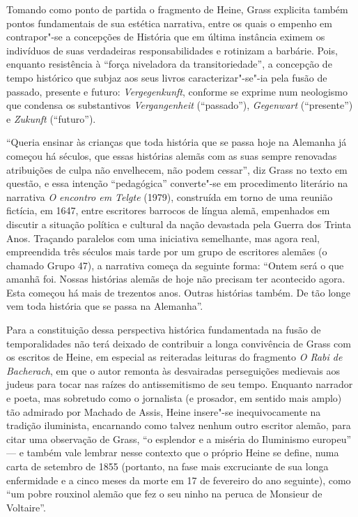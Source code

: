 Tomando como ponto de partida o fragmento de Heine, Grass explicita
também pontos fundamentais de sua estética narrativa, entre os quais o
empenho em contrapor"-se a concepções de História que em última
instância eximem os indivíduos de suas verdadeiras responsabilidades e
rotinizam a barbárie. Pois, enquanto resistência à “força niveladora da
transitoriedade”, a concepção de tempo histórico que subjaz aos seus
livros caracterizar"-se"-ia pela fusão de passado, presente e
futuro: \textit{Vergegenkunft}, conforme se exprime num neologismo que
condensa os substantivos \textit{Vergangenheit} (“passado”),
\textit{Gegenwart} (“presente”) e \textit{Zukunft} (“futuro”).

“Queria ensinar às crianças que toda história que se passa hoje na
Alemanha já começou há séculos, que essas histórias alemãs com as suas
sempre renovadas atribuições de culpa não envelhecem, não podem
cessar”, diz Grass no texto em questão, e essa intenção “pedagógica”
converte"-se em procedimento literário na narrativa \textit{O encontro
em Telgte} (1979), construída em torno de uma reunião fictícia, em
1647, entre escritores barrocos de língua alemã, empenhados em discutir
a situação política e cultural da nação devastada pela Guerra dos
Trinta Anos. Traçando paralelos com uma iniciativa semelhante, mas
agora real, empreendida três séculos mais tarde por um grupo de
escritores alemães (o chamado Grupo 47), a narrativa começa da seguinte
forma: “Ontem será o que amanhã foi. Nossas histórias alemãs de hoje
não precisam ter acontecido agora. Esta começou há mais de trezentos
anos. Outras histórias também. De tão longe vem toda história que se
passa na Alemanha”.

 Para a constituição dessa perspectiva histórica fundamentada na fusão
de temporalidades não terá deixado de contribuir a longa convivência de
Grass com os escritos de Heine, em especial as reiteradas leituras do
fragmento \textit{O Rabi de Bacherach}, em que o autor remonta às
desvairadas perseguições medievais aos judeus para tocar nas raízes do
antissemitismo de seu tempo. Enquanto narrador e poeta, mas sobretudo
como o jornalista (e prosador, em sentido mais amplo) tão admirado por
Machado de Assis, Heine insere"-se inequivocamente na tradição
iluminista, encarnando como talvez nenhum outro escritor alemão, para
citar uma observação de Grass, “o esplendor e a miséria do Iluminismo
europeu” --- e também vale lembrar nesse contexto que o próprio Heine se
define, numa carta de setembro de 1855 (portanto, na fase mais
excruciante de sua longa enfermidade e a cinco meses da morte em 17 de
fevereiro do ano seguinte), como “um pobre rouxinol alemão que fez o
seu ninho na peruca de Monsieur de Voltaire”.

